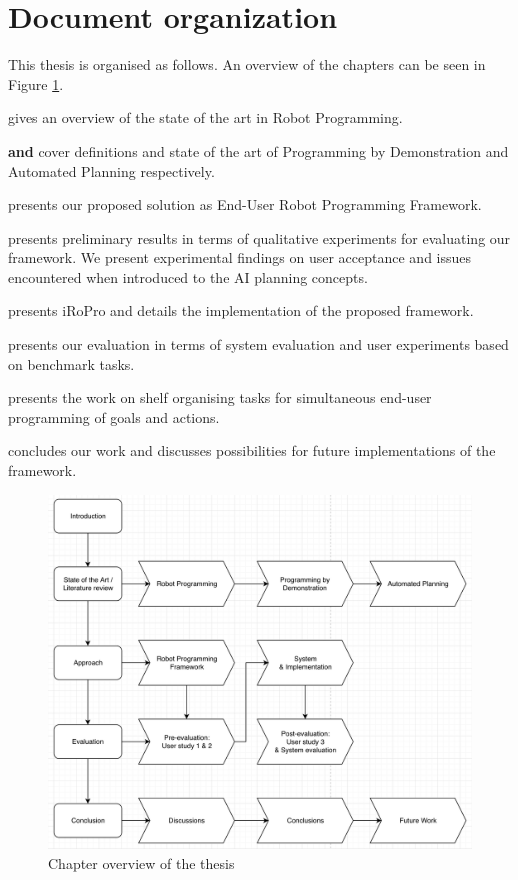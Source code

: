 \section{Document organization}
This thesis is organised as follows. 
An overview of the chapters can be seen in Figure \ref{fig:chapter-overview}.

\textbf{} gives an overview of the state of the art in Robot Programming.

\textbf{ and } cover definitions and state of the art of Programming by Demonstration and Automated Planning respectively.

\textbf{} presents our proposed solution as End-User Robot Programming Framework.

\textbf{} presents preliminary results in terms of qualitative experiments for evaluating our framework. We present experimental findings on user acceptance and issues encountered when introduced to the AI planning concepts.

\textbf{} presents iRoPro and details the implementation of the proposed framework. 

\textbf{} presents our evaluation in terms of system evaluation and user experiments based on benchmark tasks.

\textbf{} presents the work on shelf organising tasks for simultaneous end-user programming of goals and actions.

\textbf{} concludes our work and discusses possibilities for future implementations of the framework.

%


\begin{figure}[h]
	\includegraphics[width=\linewidth]{figures/chapter-overview.png}
	\caption{Chapter overview of the thesis}
	\label{fig:chapter-overview}
\end{figure}
